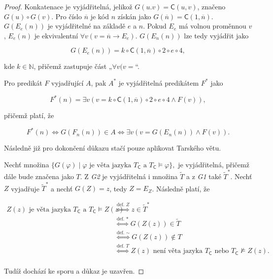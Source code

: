 \documentclass[a4paper, 12pt]{article}
\theoremstyle{definition}
\theoremstyle{definition}
\theoremstyle{definition}
\theoremstyle{remark}
\theoremstyle{remark}
\theoremstyle{remark}
\theoremstyle{remark}
\begin{document}
\begin{proof}
    Konkatenace je vyjádřitelná, jelikož $G(u.v) = \mathsf{C}(u, v)$, značeno $G(u) \circ G(v)$. Pro číslo $\overline{n}$ je kód $n$ získán jako $G(\overline{n}) = \mathsf{C}(1, \overline{n})$. $G(E_e(n))$ je vyjádřitelné na základě $e$ a $n$. Pokud $E_e$ má volnou proměnnou $v$, $E_e(n)$ je ekvivalentní $\forall v (v = \overline{n} \rightarrow E_e)$. $G(E_n(n))$ lze tedy vyjádřit jako

    $$G(E_e(n)) = k \circ \mathsf{C}(1, \overline{n}) \circ 2 \circ e \circ 4,$$

    \noindent
    kde $k \in \mathbb{N}$, přičemž zastupuje část „$\forall v (v =$“.

    Pro predikát $F$ vyjadřující $A$, pak $A^\ast$ je vyjádřitelná predikátem $F^\ast$ jako

    $$F^\ast(n) = \exists v(v = k \circ \mathsf{C}(1, \overline{n}) \circ 2 \circ e \circ 4 \wedge F(v)),$$

    \noindent
    přičemž platí, že

    $$F^\ast(n) \Longleftrightarrow G(F_n(n)) \in A \Longleftrightarrow \exists v(v = G(E_n(n)) \wedge F(v)).$$

    Následně již pro dokončení důkazu stačí pouze aplikovat Tarského větu.

    Nechť množina $\{G(\varphi) \; | \; \varphi \text{ je věta jazyka } T_\mathsf{C} \text{ a } T_\mathsf{C} \models \varphi\},$ je vyjádřitelná, přičemž dále bude značena jako $T$. Z \textit{G2} je vyjádřitelná i množina $\tilde{T}$ a z \textit{G1} také $\tilde{T}^\ast$. Nechť $Z$ vyjadřuje $\tilde{T}^\ast$ a nechť $G(Z) = z$, tedy $Z = E_Z$. Následně platí, že

    \begin{align*}
        Z(z) \text{ je věta jazyka } T_\mathsf{C} \text{ a } T_\mathsf{C} \models Z(z) &\stackrel{\text{def. }Z}{\Longleftrightarrow} z \in \tilde{T}^\ast \\
        &\stackrel{\text{def. }\ast}{\Longleftrightarrow} G(Z(z)) \in \tilde{T} \\
        &\stackrel{\text{def. }\sim}{\Longleftrightarrow} G(Z(z)) \not\in T \\
        &\stackrel{\text{def. }T}{\Longleftrightarrow} Z(z) \text{ není věta jazyka } T_\mathsf{C} \text{ nebo } T_\mathsf{C} \not\models Z(z). \\
    \end{align*}

    \noindent
    Tudíž dochází ke sporu a důkaz je uzavřen.
\end{proof}
\end{document}
